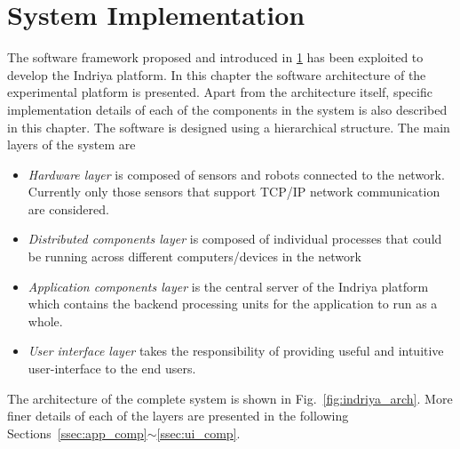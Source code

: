 
\chapter{System Implementation} %

\label{Chapter4} %

The software framework proposed and introduced in \ref{Chapter4} has been exploited to develop the Indriya platform. In this chapter the software architecture of the experimental platform is presented. Apart from the architecture itself, specific implementation details of each of the components in the system is also described in this chapter.  The software is designed using a hierarchical structure. The main layers of the system are
\begin{itemize}
\item \emph{Hardware layer} is composed of sensors and robots connected to the network. Currently only those sensors that support TCP/IP network communication are considered.
\item \emph{Distributed components layer} is composed of individual processes that could be running across different computers/devices in the network
\item \emph{Application components layer} is the central server of the Indriya platform which contains the backend processing units for the application to run as a whole.
\item \emph{User interface layer} takes the responsibility of providing useful and intuitive user-interface to the end users.
\end{itemize}
The architecture of the complete system is shown in Fig.~\ref{fig:indriya_arch}. More finer details of each of the layers are presented in the following Sections~\ref{ssec:app_comp}$\sim$\ref{ssec:ui_comp}.
